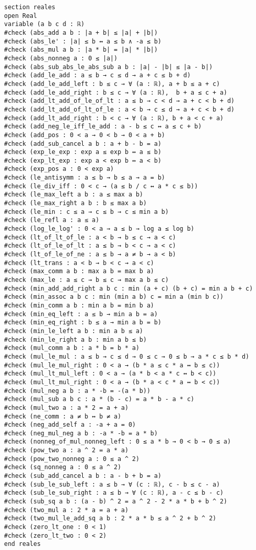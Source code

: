 \begin{verbatim}
section reales
open Real
variable (a b c d : ℝ)
#check (abs_add a b : |a + b| ≤ |a| + |b|)
#check (abs_le' : |a| ≤ b ↔ a ≤ b ∧ -a ≤ b)
#check (abs_mul a b : |a * b| = |a| * |b|)
#check (abs_nonneg a : 0 ≤ |a|)
#check (abs_sub_abs_le_abs_sub a b : |a| - |b| ≤ |a - b|)
#check (add_le_add : a ≤ b → c ≤ d → a + c ≤ b + d)
#check (add_le_add_left : b ≤ c → ∀ (a : ℝ), a + b ≤ a + c)
#check (add_le_add_right : b ≤ c → ∀ (a : ℝ),  b + a ≤ c + a)
#check (add_lt_add_of_le_of_lt : a ≤ b → c < d → a + c < b + d)
#check (add_lt_add_of_lt_of_le : a < b → c ≤ d → a + c < b + d)
#check (add_lt_add_right : b < c → ∀ (a : ℝ), b + a < c + a)
#check (add_neg_le_iff_le_add : a - b ≤ c ↔ a ≤ c + b)
#check (add_pos : 0 < a → 0 < b → 0 < a + b)
#check (add_sub_cancel a b : a + b - b = a)
#check (exp_le_exp : exp a ≤ exp b ↔ a ≤ b)
#check (exp_lt_exp : exp a < exp b ↔ a < b)
#check (exp_pos a : 0 < exp a)
#check (le_antisymm : a ≤ b → b ≤ a → a = b)
#check (le_div_iff : 0 < c → (a ≤ b / c ↔ a * c ≤ b))
#check (le_max_left a b : a ≤ max a b)
#check (le_max_right a b : b ≤ max a b)
#check (le_min : c ≤ a → c ≤ b → c ≤ min a b)
#check (le_refl a : a ≤ a)
#check (log_le_log' : 0 < a → a ≤ b → log a ≤ log b)
#check (lt_of_lt_of_le : a < b → b ≤ c → a < c)
#check (lt_of_le_of_lt : a ≤ b → b < c → a < c)
#check (lt_of_le_of_ne : a ≤ b → a ≠ b → a < b)
#check (lt_trans : a < b → b < c → a < c)
#check (max_comm a b : max a b = max b a)
#check (max_le : a ≤ c → b ≤ c → max a b ≤ c)
#check (min_add_add_right a b c : min (a + c) (b + c) = min a b + c)
#check (min_assoc a b c : min (min a b) c = min a (min b c))
#check (min_comm a b : min a b = min b a)
#check (min_eq_left : a ≤ b → min a b = a)
#check (min_eq_right : b ≤ a → min a b = b)
#check (min_le_left a b : min a b ≤ a)
#check (min_le_right a b : min a b ≤ b)
#check (mul_comm a b : a * b = b * a)
#check (mul_le_mul : a ≤ b → c ≤ d → 0 ≤ c → 0 ≤ b → a * c ≤ b * d)
#check (mul_le_mul_right : 0 < a → (b * a ≤ c * a ↔ b ≤ c))
#check (mul_lt_mul_left : 0 < a → (a * b < a * c ↔ b < c))
#check (mul_lt_mul_right : 0 < a → (b * a < c * a ↔ b < c))
#check (mul_neg a b : a * -b = -(a * b))
#check (mul_sub a b c : a * (b - c) = a * b - a * c)
#check (mul_two a : a * 2 = a + a)
#check (ne_comm : a ≠ b ↔ b ≠ a)
#check (neg_add_self a : -a + a = 0)
#check (neg_mul_neg a b : -a * -b = a * b)
#check (nonneg_of_mul_nonneg_left : 0 ≤ a * b → 0 < b → 0 ≤ a)
#check (pow_two a : a ^ 2 = a * a)
#check (pow_two_nonneg a : 0 ≤ a ^ 2)
#check (sq_nonneg a : 0 ≤ a ^ 2)
#check (sub_add_cancel a b : a - b + b = a)
#check (sub_le_sub_left : a ≤ b → ∀ (c : ℝ), c - b ≤ c - a)
#check (sub_le_sub_right : a ≤ b → ∀ (c : ℝ), a - c ≤ b - c)
#check (sub_sq a b : (a - b) ^ 2 = a ^ 2 - 2 * a * b + b ^ 2)
#check (two_mul a : 2 * a = a + a)
#check (two_mul_le_add_sq a b : 2 * a * b ≤ a ^ 2 + b ^ 2)
#check (zero_lt_one : 0 < 1)
#check (zero_lt_two : 0 < 2)
end reales


\end{verbatim}
